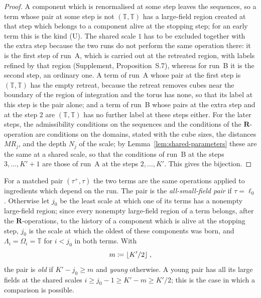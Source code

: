 \documentclass[11pt]{preprint}
\DeclarePairedDelimiter{\floor}{\lfloor}{\rfloor}
\numberwithin{equation}{section}
\theoremstyle{definition}
\theoremstyle{remark}
\theoremstyle{plain}
\begin{document}
\begin{proof}
A component which is renormalised at some step leaves the sequences, so a term whose pair at some step is not $(\mathbb T, \mathbb T)$ has a large-field region created at that step which belongs to a component alive at the stopping step; for an early term this is the kind (U). The shared scale $1$ has to be excluded together with the extra step because the two runs do not perform the same operation there: it is the first step of run~A, which is carried out at the retreated region, with labels refined by that region (Supplement, Proposition~S.7), whereas for run~B it is the second step, an ordinary one. A term of run~A whose pair at the first step is $(\mathbb T, \mathbb T)$ has the empty retreat, because the retreat removes cubes near the boundary of the region of integration and the torus has none, so that its label at this step is the pair alone; and a term of run~B whose pairs at the extra step and at the step $2$ are $(\mathbb T, \mathbb T)$ has no further label at these steps either. For the later steps, the admissibility conditions on the sequences \cite[pp.~255--256]{BalabanCRE} and the conditions of the $\mathbf R$-operation \cite[p.~177, (i), (ii)]{BalabanLFR1} are conditions on the domains, stated with the cube sizes, the distances $MR_j$, and the depth $N_j$ of the scale; by Lemma~\ref{lem:shared-parameters} these are the same at a shared scale, so that the conditions of run~B at the steps $3, \dots, K' + 1$ are those of run~A at the steps $2, \dots, K'$. This gives the bijection.
\end{proof}

For a matched pair $(\tau^+, \tau)$ the two terms are the same operations applied to ingredients which depend on the run. The pair is the \emph{all-small-field pair} if $\tau = \ell_0$. Otherwise let $j_0$ be the least scale at which one of its terms has a nonempty large-field region; since every nonempty large-field region of a term belongs, after the $\mathbf R$-operations, to the history of a component which is alive at the stopping step, $j_0$ is the scale at which the oldest of these components was born, and $\Lambda_i = \Omega_i = \mathbb T$ for $i < j_0$ in both terms. With
\begin{equation}\label{eq:young-old}
    m \coloneqq \floor{K'/2}\;,
\end{equation}
the pair is \emph{old} if $K' - j_0 \geq m$ and \emph{young} otherwise. A young pair has all its large fields at the shared scales $i \geq j_0 - 1 \geq K' - m \geq K'/2$; this is the case in which a comparison is possible.
\end{document}
